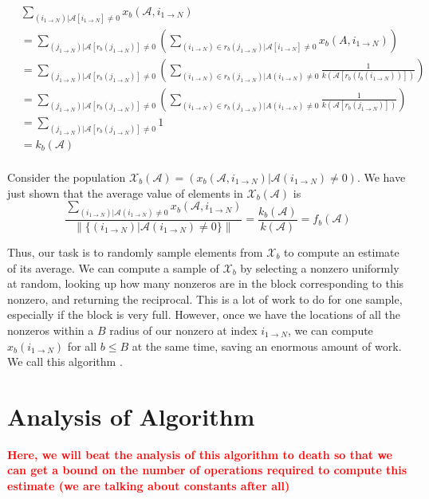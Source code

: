 \documentclass[12pt]{article}
\newcommand{\todo}[1] {\textbf{\textcolor{red}{#1}}}
\newcommand{\Ten}[1] {\mathbf{\mathcal{#1}}}
\newcommand{\Pop}[1] {\mathcal{#1}}
\begin{document}
    \begin{align*}
      &\sum\limits_{(i_{1 \to N}) | \Ten{A}[i_{1 \to N}] \neq 0} x_b(\Ten{A}, i_{1 \to N})\\ &= \sum\limits_{(j_{1 \to N}) | \Ten{A}[r_b(j_{1 \to N})] \neq 0} \left(\sum\limits_{(i_{1 \to N}) \in r_b(j_{1 \to N}) | \Ten{A}[i_{1 \to N}] \neq 0} x_b(A, i_{1 \to N})\right)\\
      &= \sum\limits_{(j_{1 \to N}) | \Ten{A}[r_b(j_{1 \to N})] \neq 0} \left(\sum\limits_{(i_{1 \to N}) \in r_b(j_{1 \to N}) | A(i_{1 \to N}) \neq 0} \frac{1}{k(\Ten{A}[r_b(l_b(i_{1 \to N}))])}\right)\\
      &= \sum\limits_{(j_{1 \to N}) | \Ten{A}[r_b(j_{1 \to N})] \neq 0} \left(\sum\limits_{(i_{1 \to N}) \in r_b(j_{1 \to N}) | A(i_{1 \to N}) \neq 0} \frac{1}{k(\Ten{A}[r_b(j_{1 \to N})])}\right)\\
      &= \sum\limits_{(j_{1 \to N}) | \Ten{A}[r_b(j_{1 \to N})] \neq 0} 1\\
      &= k_b(\Ten{A})\\
    \end{align*}

    Consider the population $\Pop{X}_b(\Ten{A}) = \left(x_b(\Ten{A}, i_{1 \to N}) | \Ten{A}(i_{1 \to N}) \neq 0\right)$. We have just shown that the average value of elements in $\Pop{X}_b(\Ten{A})$ is
    \[
      \frac{\sum\limits_{(i_{1 \to N}) | \Ten{A}(i_{1 \to N}) \neq 0} x_b(\Ten{A}, i_{1 \to N})}{\|\{(i_{1 \to N}) | \Ten{A}(i_{1 \to N}) \neq 0\}\|} = \frac{k_b(\Ten{A})}{k(\Ten{A})} = f_b(\Ten{A})
    \]

    Thus, our task is to randomly sample elements from $\Pop{X}_b$ to compute an estimate of its average. We can compute a sample of $\Pop{X}_b$ by selecting a nonzero uniformly at random, looking up how many nonzeros are in the block corresponding to this nonzero, and returning the reciprocal. This is a lot of work to do for one sample, especially if the block is very full. However, once we have the locations of all the nonzeros within a $B$ radius of our nonzero at index $i_{1 \to N}$, we can compute $x_b(i_{1 \to N})$ for all $b \leq B$ at the same time, saving an enormous amount of work. We call this algorithm .

    



  \section{Analysis of Algorithm}
    \todo{Here, we will beat the analysis of this algorithm to death so that we can get a bound on the number of operations required to compute this estimate (we are talking about constants after all)}
\end{document}
